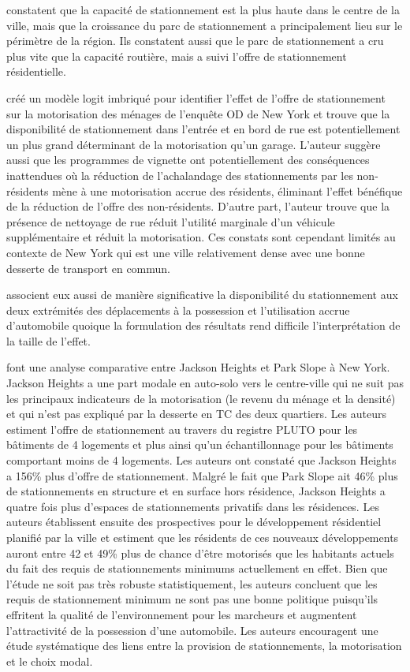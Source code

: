 \textcite{Chester:ParkingInfrastructure:2015} constatent que la capacité de stationnement est la plus haute dans le centre de la ville, mais que la croissance du parc de stationnement a principalement lieu sur le périmètre de la région.  Ils constatent aussi que le parc de stationnement a cru plus vite que la capacité routière, mais a suivi l'offre de stationnement résidentielle.\par
\textcite{Guo:DoesResidential:2013} créé un modèle logit imbriqué pour identifier l'effet de l'offre de stationnement sur la motorisation des ménages de l'enquête OD de New York et trouve que la disponibilité de stationnement dans l'entrée et en bord de rue est potentiellement un plus grand déterminant de la motorisation qu'un garage. L'auteur suggère aussi que les programmes de vignette ont potentiellement des conséquences inattendues où la réduction de l'achalandage des stationnements par les non-résidents mène à une motorisation accrue des résidents, éliminant l'effet bénéfique de la réduction de l'offre des non-résidents. D'autre part, l'auteur trouve que la présence de nettoyage de rue réduit l'utilité marginale d'un véhicule supplémentaire et réduit la motorisation. Ces constats sont cependant limités au contexte de New York qui est une ville relativement dense avec une bonne desserte de transport en commun.\par
\textcite{Yin:BuiltEnvironment:2018a} associent eux aussi de manière significative la disponibilité du stationnement aux deux extrémités des déplacements à la possession et l'utilisation accrue d'automobile quoique la formulation des résultats rend difficile l'interprétation de la taille de l'effet.\par
\textcite{Weinberger:ResidentialOffStreet:2009} font une analyse comparative entre Jackson Heights et Park Slope à New York. Jackson Heights a une part modale en auto-solo vers le centre-ville qui ne suit pas les principaux indicateurs de la motorisation (le revenu du ménage et la densité) et qui n'est pas expliqué par la desserte en \ac{TC} des deux quartiers. Les auteurs estiment l'offre de stationnement au travers du registre \ac{PLUTO} pour les bâtiments de 4 logements et plus ainsi qu'un échantillonnage pour les bâtiments comportant moins de 4 logements. Les auteurs ont constaté que Jackson Heights a 156\% plus d'offre de stationnement. Malgré le fait que Park Slope ait 46\% plus de stationnements en structure et en surface hors résidence, Jackson Heights a quatre fois plus d'espaces de stationnements privatifs dans les résidences. Les auteurs établissent ensuite des prospectives pour le développement résidentiel planifié par la ville et estiment que les résidents de ces nouveaux développements auront entre 42 et 49\% plus de chance d'être motorisés que les habitants actuels du fait des requis de stationnements minimums actuellement en effet. Bien que l'étude ne soit pas très robuste statistiquement, les auteurs concluent que les requis de stationnement minimum ne sont pas une bonne politique puisqu'ils effritent la qualité de l'environnement pour les marcheurs et augmentent l'attractivité de la possession d'une automobile. Les auteurs encouragent une étude systématique des liens entre la provision de stationnements, la motorisation et le choix modal.\par
